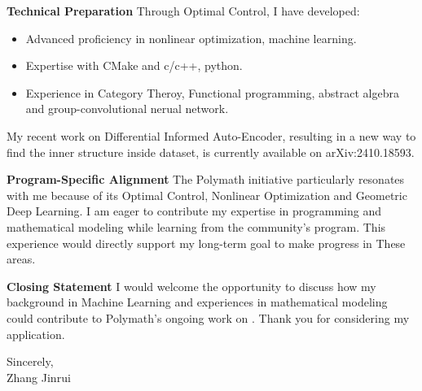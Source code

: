 \documentclass[11pt]{article}
\begin{document}
\par\textbf{Technical Preparation}
Through Optimal Control, I have developed:
\begin{itemize}
    \item Advanced proficiency in nonlinear optimization, machine learning.
    \item Expertise with CMake and c/c++, python.
    \item Experience in Category Theroy, Functional programming, abstract algebra and group-convolutional nerual network.
\end{itemize}
My recent work on Differential Informed Auto-Encoder, resulting in a new way to find the inner structure inside dataset, is currently available on arXiv:2410.18593.

\par\textbf{Program-Specific Alignment}
The Polymath initiative particularly resonates
with me because of its
Optimal Control, Nonlinear Optimization and
Geometric Deep Learning. I am eager to contribute
my expertise in programming and mathematical modeling
while learning from the community's program.
This experience would directly support
my long-term goal to make progress in These areas.

\par\textbf{Closing Statement}
I would welcome the opportunity
to discuss how my background in
Machine Learning and
experiences in mathematical modeling
could contribute to
Polymath's ongoing work on .
Thank you for considering my application.

\vspace{0.5cm}

Sincerely,\\
Zhang Jinrui\\
\end{document}
